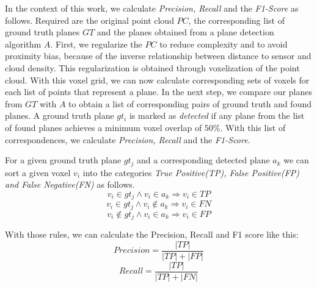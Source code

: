 \documentclass[main.tex]{subfiles}
\begin{document}
In the context of this work, we calculate \textit{Precision, Recall} and the \textit{F1-Score} as follows.
Required are the original point cloud $PC$, the corresponding list of ground truth planes $GT$ and the planes obtained from a plane detection algorithm $A$.
First, we regularize the $PC$ to reduce complexity and to avoid proximity bias, because of the inverse relationship
between distance to sensor and cloud density. This regularization is obtained through voxelization of the point cloud.
With this voxel grid, we can now calculate corresponding sets of voxels for each list of points that represent a plane.
In the next step, we compare our planes from $GT$ with $A$ to obtain a list of corresponding pairs of ground truth and found planes.
A ground truth plane $gt_i$ is marked as \textit{detected} if any plane from the list of found planes achieves a minimum voxel overlap of $50\%$.
With this list of correspondences, we calculate \textit{Precision, Recall} and the \textit{F1-Score}.

For a given ground truth plane $gt_j$ and a corresponding detected plane $a_k$ we can sort a given voxel $v_i$ into the categories
\textit{True Positive(TP), False Positive(FP) and False Negative(FN)} as follows.
$$v_i \in gt_j \land v_i \in a_k \Rightarrow v_{i} \in TP$$
$$v_i \in gt_j \land v_i \notin a_k \Rightarrow v_{i} \in FN$$
$$v_i \notin gt_j \land v_i \in a_k \Rightarrow v_{i} \in FP$$

With those rules, we can calculate the Precision, Recall and F1 score like this:
$$Precision = \frac{|TP|}{|TP|+|FP|}$$
$$Recall = \frac{|TP|}{|TP|+|FN|}$$
\end{document}
